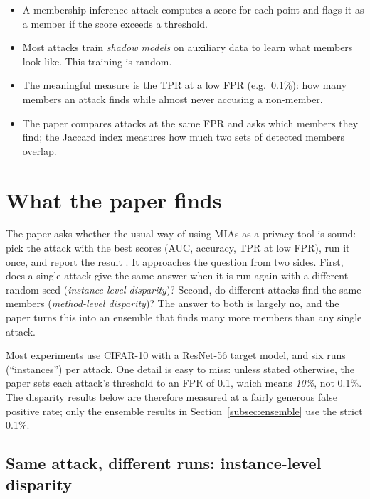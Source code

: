 \documentclass[a4paper]{article}
\begin{document}
\begin{keypoints}
\begin{itemize}
  \item A membership inference attack computes a score for each point and flags it as a member if the score exceeds a threshold.
  \item Most attacks train \emph{shadow models} on auxiliary data to learn what members look like. This training is random.
  \item The meaningful measure is the TPR at a low FPR (e.g.\ 0.1\%): how many members an attack finds while almost never accusing a non-member.
  \item The paper compares attacks at the same FPR and asks which members they find; the Jaccard index measures how much two sets of detected members overlap.
\end{itemize}
\end{keypoints}

\section{What the paper finds}
\label{sec:findings}

The paper asks whether the usual way of using MIAs as a privacy tool is sound: pick the attack with the best scores (AUC, accuracy, TPR at low FPR), run it once, and report the result \citep{wang2025mia}.
It approaches the question from two sides.
First, does a single attack give the same answer when it is run again with a different random seed (\emph{instance-level disparity})?
Second, do different attacks find the same members (\emph{method-level disparity})?
The answer to both is largely no, and the paper turns this into an ensemble that finds many more members than any single attack.

Most experiments use CIFAR-10 with a ResNet-56 target model, and six runs (``instances'') per attack.
One detail is easy to miss: unless stated otherwise, the paper sets each attack's threshold to an FPR of 0.1, which means \emph{10\%}, not 0.1\%.
The disparity results below are therefore measured at a fairly generous false positive rate; only the ensemble results in Section~\ref{subsec:ensemble} use the strict 0.1\%.

\subsection{Same attack, different runs: instance-level disparity}
\label{subsec:instance-disparity}
\end{document}
